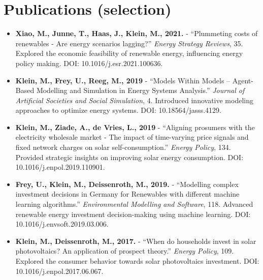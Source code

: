 \documentclass[a4paper,11pt]{article}
\newcommand{\resumeItem}[2]{
  \item\small{
    \textbf{#1}{ - #2 \vspace{-2pt}}
  }
}
\newcommand{\resumeSubItem}[2]{\resumeItem{#1}{#2}\vspace{-4pt}}
\newcommand{\resumeSubHeadingListStart}{\begin{itemize}[leftmargin=*]}
\newcommand{\resumeSubHeadingListEnd}{\end{itemize}}
\begin{document}
\bigskip 
\bigskip




\section{Publications (selection)}
  \resumeSubHeadingListStart
    \resumeSubItem
      {Xiao, M., Junne, T., Haas, J., Klein, M., 2021.}
      {``Plummeting costs of renewables - Are energy scenarios lagging?'' \textit{Energy Strategy Reviews}, 35. Explored the economic feasibility of renewable energy, influencing energy policy making. DOI: 10.1016/j.esr.2021.100636.}

    \resumeSubItem
      {Klein, M., Frey, U., Reeg, M., 2019}
      {``Models Within Models -- Agent-Based Modelling and Simulation in Energy Systems Analysis.'' \textit{Journal of Artificial Societies and Social Simulation}, 4. Introduced innovative modeling approaches to optimize energy systems. DOI: 10.18564/jasss.4129.}

    \resumeSubItem
      {Klein, M., Ziade, A., de Vries, L., 2019}
      {``Aligning prosumers with the electricity wholesale market - The impact of time-varying price signals and fixed network charges on solar self-consumption.'' \textit{Energy Policy}, 134. Provided strategic insights on improving solar energy consumption. DOI: 10.1016/j.enpol.2019.110901.}

    \resumeSubItem
      {Frey, U., Klein, M., Deissenroth, M., 2019. }
      {``Modelling complex investment decisions in Germany for Renewables with different machine learning algorithms.'' \textit{Environmental Modelling and Software}, 118. Advanced renewable energy investment decision-making using machine learning. DOI: 10.1016/j.envsoft.2019.03.006.}

    \resumeSubItem
      {Klein, M., Deissenroth, M., 2017.}
      {``When do households invest in solar photovoltaics? An application of prospect theory.'' \textit{Energy Policy}, 109. Explored the consumer behavior towards solar photovoltaics investment. DOI: 10.1016/j.enpol.2017.06.067.}
  \resumeSubHeadingListEnd
\bigskip



\bigskip 
\end{document}
